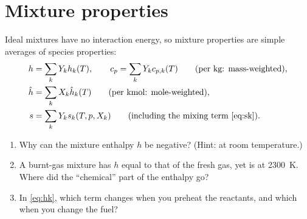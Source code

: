 \section{Mixture properties}

Ideal mixtures have no interaction energy, so mixture properties are simple averages of species
properties:
\begin{align}
  h&=\sum_kY_kh_k(T),\qquad c_p=\sum_kY_kc_{p,k}(T)\qquad\text{(per kg: mass-weighted)},\\
  \hat h&=\sum_kX_k\hat h_k(T)\qquad\text{(per kmol: mole-weighted)},\\
  s&=\sum_kY_k s_k(T,p,X_k)\qquad\text{(including the mixing term \eqref{eq:sk})}.
\end{align}

\begin{selfcheck}
\begin{enumerate}
  \item Why can the mixture enthalpy $h$ be negative? (Hint:  at room temperature.)
  \item A burnt-gas mixture has $h$ equal to that of the fresh gas, yet is at \SI{2300}{\kelvin}.
        Where did the ``chemical'' part of the enthalpy go?
  \item In \eqref{eq:hk}, which term changes when you preheat the reactants, and which when you
        change the fuel?
\end{enumerate}
\end{selfcheck}
